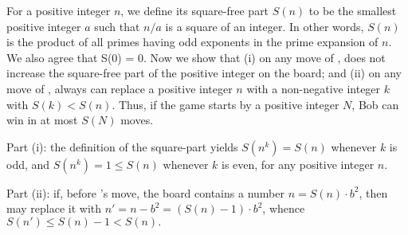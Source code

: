  For a positive integer $n$, we define its square-free part $S(n)$ to be the smallest positive integer $a$ such that $n/a$ is a square of an integer.  In other words, $S(n)$ is the product of all primes having odd exponents in the prime expansion of $n$.  We also agree that S(0) = 0. Now we show that (i) on any move of ,  does not increase the square-free part of the positive integer on the board; and (ii) on any move of ,  always can replace a positive integer $n$ with a non-negative integer $k$ with $S(k) < S(n)$.  Thus, if the game starts by a positive integer $N$, Bob can win in at most $S(N)$ moves.

Part (i): the definition of the square-part yields $S(n^k) = S(n)$ whenever $k$ is odd, and $S(n^k) = 1 \le S(n)$ whenever $k$ is even, for any positive integer $n$.

Part (ii):  if, before ’s move, the board contains a number $n=S(n)\cdot b^2$, then  may replace it with $n′= n - b^2= (S(n) - 1)\cdot b^2$, whence $ S(n′) \le S(n)-1 < S(n).$